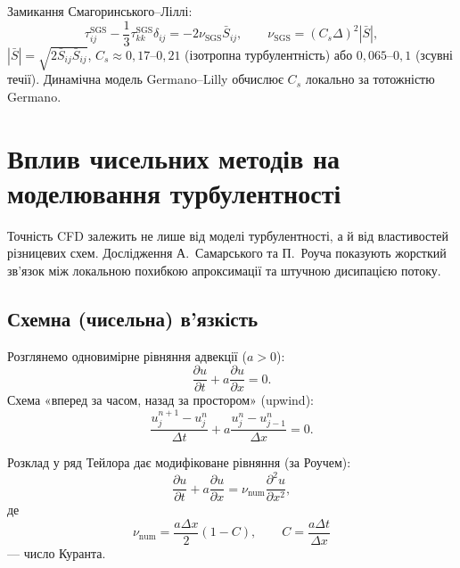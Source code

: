 \documentclass[14pt,a4paper,extarticle]{extarticle}
\begin{document}
Замикання Смагоринського--Ліллі:
\begin{equation}
  \tau_{ij}^{\mathrm{SGS}} - \frac{1}{3}\tau_{kk}^{\mathrm{SGS}}\delta_{ij}
  = -2 \nu_{\mathrm{SGS}} \bar{S}_{ij},
  \qquad
  \nu_{\mathrm{SGS}} = (C_s \Delta)^2 |\bar{S}|,
  \label{eq:smagorinsky}
\end{equation}
$|\bar{S}| = \sqrt{2 \bar{S}_{ij} \bar{S}_{ij}}$, $C_s \approx 0{,}17$--$0{,}21$
(ізотропна турбулентність) або $0{,}065$--$0{,}1$ (зсувні течії). Динамічна
модель Germano--Lilly обчислює $C_s$ локально за тотожністю Germano.

\section{Вплив чисельних методів на моделювання турбулентності}

Точність CFD залежить не лише від моделі турбулентності, а й від властивостей
різницевих схем. Дослідження А.~Самарського та П.~Роуча показують жорсткий
зв'язок між локальною похибкою апроксимації та штучною дисипацією потоку.

\subsection{Схемна (чисельна) в'язкість}

Розглянемо одновимірне рівняння адвекції ($a > 0$):
\begin{equation}
  \frac{\partial u}{\partial t} + a \frac{\partial u}{\partial x} = 0.
  \label{eq:advection}
\end{equation}
Схема «вперед за часом, назад за простором» (upwind):
\begin{equation}
  \frac{u_j^{n+1} - u_j^n}{\Delta t} + a \frac{u_j^n - u_{j-1}^n}{\Delta x} = 0.
  \label{eq:upwind}
\end{equation}

Розклад у ряд Тейлора дає модифіковане рівняння (за Роучем):
\begin{equation}
  \frac{\partial u}{\partial t} + a \frac{\partial u}{\partial x}
  = \nu_{\mathrm{num}} \frac{\partial^2 u}{\partial x^2},
  \label{eq:modified}
\end{equation}
де
\begin{equation}
  \nu_{\mathrm{num}} = \frac{a \Delta x}{2} (1 - C),
  \qquad C = \frac{a \Delta t}{\Delta x}
  \label{eq:num-visc}
\end{equation}
--- число Куранта.
\end{document}
